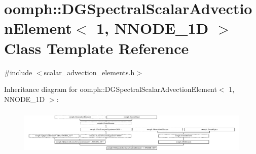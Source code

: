 \hypertarget{classoomph_1_1DGSpectralScalarAdvectionElement_3_011_00_01NNODE__1D_01_4}{}\section{oomph\+:\+:D\+G\+Spectral\+Scalar\+Advection\+Element$<$ 1, N\+N\+O\+D\+E\+\_\+1D $>$ Class Template Reference}
\label{classoomph_1_1DGSpectralScalarAdvectionElement_3_011_00_01NNODE__1D_01_4}


{\ttfamily \#include $<$scalar\+\_\+advection\+\_\+elements.\+h$>$}

Inheritance diagram for oomph\+:\+:D\+G\+Spectral\+Scalar\+Advection\+Element$<$ 1, N\+N\+O\+D\+E\+\_\+1D $>$\+:\begin{figure}[H]
\begin{center}
\leavevmode
\includegraphics[height=2.245989cm]{classoomph_1_1DGSpectralScalarAdvectionElement_3_011_00_01NNODE__1D_01_4}
\end{center}
\end{figure}
